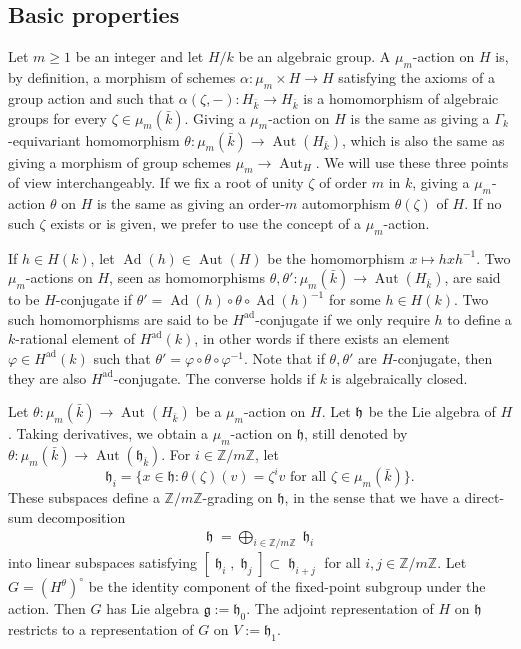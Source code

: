 \documentclass{article} %
\numberwithin{equation}{section}
\theoremstyle{definition}
\DeclareMathOperator{\lieh}{\mathfrak{h}}
\DeclareMathOperator{\Ad}{Ad}
\DeclareMathOperator{\Aut}{Aut}
\newcommand{\Z}{\mathbb{Z}}
\newcommand{\frakg}{\mathfrak g}
\newcommand{\frakh}{\mathfrak h}
\begin{document}
\subsection{Basic properties}

Let $m\geq 1$ be an integer and let $H/k$ be an algebraic group.
A $\mu_m$-action on $H$ is, by definition, a morphism of schemes $\alpha\colon \mu_m \times H\rightarrow H$ satisfying the axioms of a group action and such that $\alpha(\zeta,-)\colon H_{\bar{k}}\rightarrow H_{\bar{k}}$ is a homomorphism of algebraic groups for every $\zeta \in \mu_m(\bar{k})$.
Giving a $\mu_m$-action on $H$ is the same as giving a $\Gamma_k$-equivariant homomorphism $\theta\colon \mu_m(\bar{k})\rightarrow \Aut(H_{\bar{k}})$, which is also the same as giving a morphism of group schemes $\mu_m\rightarrow \Aut_H$.
We will use these three points of view interchangeably.
If we fix a root of unity $\zeta$ of order $m$ in $k$, giving a $\mu_m$-action $\theta$ on $H$ is the same as giving an order-$m$ automorphism $\theta(\zeta)$ of $H$.
If no such $\zeta$ exists or is given, we prefer to use the concept of a $\mu_m$-action.

If $h\in H(k)$, let $\Ad(h)\in \Aut(H)$ be the homomorphism $x\mapsto hxh^{-1}$.
Two $\mu_m$-actions on $H$, seen as homomorphisms $\theta, \theta'\colon \mu_m(\bar{k})\rightarrow \Aut(H_{\bar{k}})$, are said to be $H$-conjugate if $\theta' = \Ad(h) \circ \theta\circ \Ad(h)^{-1}$ for some $h\in H(k)$.
Two such homomorphisms are said to be $H^{\mathrm{ad}}$-conjugate if we only require $h$ to define a $k$-rational element of $H^{\mathrm{ad}}(k)$, in other words if there exists an element $\varphi\in H^{\mathrm{ad}}(k)$ such that $\theta' = \varphi \circ \theta\circ \varphi^{-1}$.
Note that if $\theta, \theta'$ are $H$-conjugate, then they are also $H^{\mathrm{ad}}$-conjugate.
The converse holds if $k$ is algebraically closed.




Let $\theta \colon \mu_m(\bar{k})\rightarrow \Aut(H_{\bar{k}})$ be a $\mu_m$-action on $H$.
Let $\frak{h}$ be the Lie algebra of $H$.
Taking derivatives, we obtain a $\mu_m$-action on $\frakh$, still denoted by $\theta\colon \mu_m(\bar{k})\rightarrow \Aut(\frakh_{\bar{k}})$.
For $i\in \Z/m\Z$, let 
\begin{equation*}
\frakh_i = \{ x\in \frakh \colon \theta(\zeta)(v) = \zeta^i v\text{ for all }\zeta\in \mu_m(\bar{k})\}.
\end{equation*}
These subspaces define a $\Z/m\Z$-grading on $\frakh$, in the sense that we have a direct-sum decomposition
\begin{align*}
\lieh = \bigoplus_{i \in \Z/m\Z} \lieh_i
\end{align*}
into linear subspaces satisfying $[\lieh_i,\lieh_j ] \subset \lieh_{i+j}$ for all $i,j\in \Z/m\Z$.
Let $G = (H^{\theta})^{\circ}$ be the identity component of the fixed-point subgroup under the action. 
Then $G$ has Lie algebra $\frakg:= \frakh_0$.
The adjoint representation of $H$ on $\frakh$ restricts to a representation of $G$ on $V:= \frakh_1$.
\end{document}
